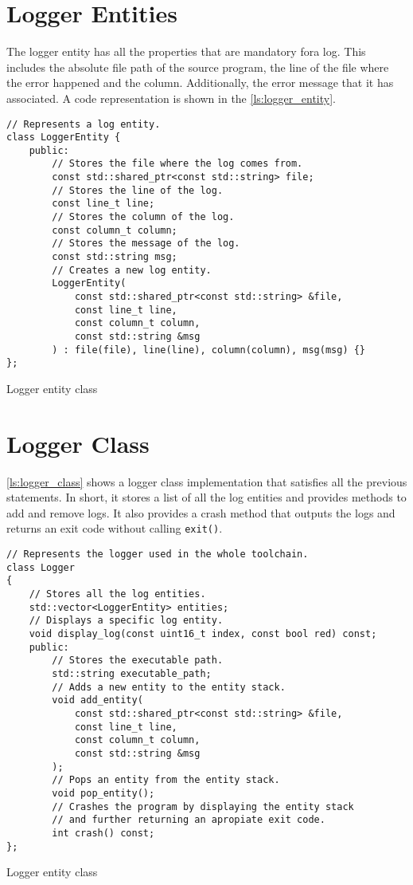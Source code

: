 \section{Logger Entities}

The logger entity has all the properties that are mandatory fora log.
This includes the absolute file path of the source program, the line of the file where the error happened
and the column. Additionally, the error message that it has associated. A code representation is shown in
the \autoref{ls:logger_entity}.

\begin{listing}[H]
\begin{verbatim}
// Represents a log entity.
class LoggerEntity {
    public:
        // Stores the file where the log comes from.
        const std::shared_ptr<const std::string> file;
        // Stores the line of the log.
        const line_t line;
        // Stores the column of the log.
        const column_t column;
        // Stores the message of the log.
        const std::string msg;
        // Creates a new log entity.
        LoggerEntity(
            const std::shared_ptr<const std::string> &file,
            const line_t line,
            const column_t column,
            const std::string &msg
        ) : file(file), line(line), column(column), msg(msg) {}
};
\end{verbatim}
\caption{Logger entity class}
\label{ls:logger_entity}
\end{listing}

\section{Logger Class}

\autoref{ls:logger_class} shows a logger class implementation that satisfies all the previous statements.
In short, it stores a list of all the log entities and provides methods to add and remove logs. It also provides a crash
method that outputs the logs and returns an exit code without calling \texttt{exit()}.

\begin{listing}[H]
\begin{verbatim}
// Represents the logger used in the whole toolchain.
class Logger
{
    // Stores all the log entities.
    std::vector<LoggerEntity> entities;
    // Displays a specific log entity.
    void display_log(const uint16_t index, const bool red) const;
    public:
        // Stores the executable path.
        std::string executable_path;
        // Adds a new entity to the entity stack.
        void add_entity(
            const std::shared_ptr<const std::string> &file,
            const line_t line,
            const column_t column,
            const std::string &msg
        );
        // Pops an entity from the entity stack.
        void pop_entity();
        // Crashes the program by displaying the entity stack
        // and further returning an apropiate exit code.
        int crash() const;
};
\end{verbatim}
\caption{Logger entity class}
\label{ls:logger_class}
\end{listing}


